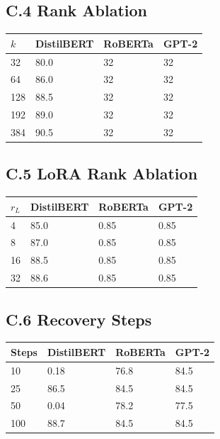 \subsection{C.4 Rank Ablation}

\begin{table}[H]
\centering
\small
\begin{tabular}{llll}
\toprule
\textbf{$k$} & \textbf{DistilBERT} & \textbf{RoBERTa} & \textbf{GPT-2} \\
\midrule
32 & 80.0 & 32 & 32 \\
64 & 86.0 & 32 & 32 \\
128 & 88.5 & 32 & 32 \\
192 & 89.0 & 32 & 32 \\
384 & 90.5 & 32 & 32 \\
\bottomrule
\end{tabular}
\end{table}

\subsection{C.5 LoRA Rank Ablation}

\begin{table}[H]
\centering
\small
\begin{tabular}{llll}
\toprule
\textbf{$r_L$} & \textbf{DistilBERT} & \textbf{RoBERTa} & \textbf{GPT-2} \\
\midrule
4 & 85.0 & 0.85 & 0.85 \\
8 & 87.0 & 0.85 & 0.85 \\
16 & 88.5 & 0.85 & 0.85 \\
32 & 88.6 & 0.85 & 0.85 \\
\bottomrule
\end{tabular}
\end{table}

\subsection{C.6 Recovery Steps}

\begin{table}[H]
\centering
\small
\begin{tabular}{llll}
\toprule
\textbf{Steps} & \textbf{DistilBERT} & \textbf{RoBERTa} & \textbf{GPT-2} \\
\midrule
10 & 0.18 & 76.8 & 84.5 \\
25 & 86.5 & 84.5 & 84.5 \\
50 & 0.04 & 78.2 & 77.5 \\
100 & 88.7 & 84.5 & 84.5 \\
\bottomrule
\end{tabular}
\end{table}

